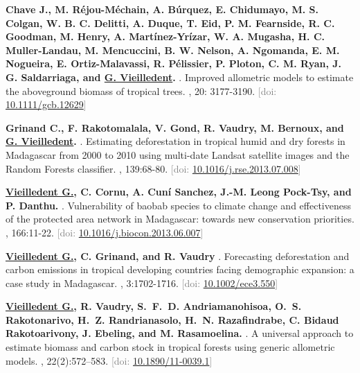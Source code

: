 \documentclass[10pt,a4paper,sans]{moderncv}
\newcounter{enumiv_gv}
\begin{document}
\begin{thebibliography}{10}
\setcounter{enumiv}{6}
\textbf{Chave J., M. Réjou-Méchain, A. Búrquez, E. Chidumayo, M. S. Colgan, W. B. C. Delitti, A. Duque, T. Eid, P. M. Fearnside, R. C. Goodman, M. Henry, A. Martínez-Yrízar, W. A. Mugasha, H. C. Muller-Landau, M. Mencuccini, B. W. Nelson, A. Ngomanda, E. M. Nogueira, E. Ortiz-Malavassi, R. Pélissier, P. Ploton, C. M. Ryan, J. G. Saldarriaga, and \underline{G. Vieilledent}.} 
.
\newblock Improved allometric models to estimate the aboveground biomass of tropical trees. 
, 20: 3177-3190.
\newblock \textcolor{gray}{[doi: \href{http://dx.doi.org/10.1111/gcb.12629}{10.1111/gcb.12629}]}

\setcounter{enumiv}{5}
\textbf{Grinand C., F. Rakotomalala, V. Gond, R. Vaudry, M. Bernoux, and \underline{G. Vieilledent}.} 
.
\newblock Estimating deforestation in tropical humid and dry forests in Madagascar from 2000 to 2010 using multi-date Landsat satellite images and the Random Forests classifier.
, 139:68-80.
\newblock \textcolor{gray}{[doi: \href{http://dx.doi.org/10.1016/j.rse.2013.07.008}{10.1016/j.rse.2013.07.008}]}

\setcounter{enumiv}{4}
\textbf{\underline{Vieilledent G.}, C. Cornu, A. Cuní Sanchez, J.-M. Leong Pock-Tsy, and
  P. Danthu.} 
.
\newblock Vulnerability of baobab species to climate change and effectiveness of the
protected area network in Madagascar: towards new conservation priorities. 
, 166:11-22.
\newblock \textcolor{gray}{[doi: \href{http://dx.doi.org/10.1016/j.biocon.2013.06.007}{10.1016/j.biocon.2013.06.007}]}

\setcounter{enumiv}{3}
\textbf{\underline{Vieilledent G.}, C. Grinand, and R. Vaudry}
. 
\newblock Forecasting deforestation and carbon emissions in tropical developing countries
facing demographic expansion: a case study in Madagascar.
, 3:1702-1716.
\newblock \textcolor{gray}{[doi: \href{http://dx.doi.org/10.1002/ece3.550}{10.1002/ece3.550}]}

\setcounter{enumiv}{2}
\textbf{\underline{Vieilledent G.}, R. Vaudry, S.~F.~D. Andriamanohisoa, O.~S. Rakotonarivo, H.~Z.
  Randrianasolo, H.~N. Razafindrabe, C. Bidaud Rakotoarivony, J. Ebeling, and M. Rasamoelina.}
.
\newblock A universal approach to estimate biomass and carbon stock in tropical
  forests using generic allometric models.
, 22(2):572--583.
\newblock \textcolor{gray}{[doi: \href{http://dx.doi.org/10.1890/11-0039.1}{10.1890/11-0039.1}]}


\end{thebibliography}
\end{document}
